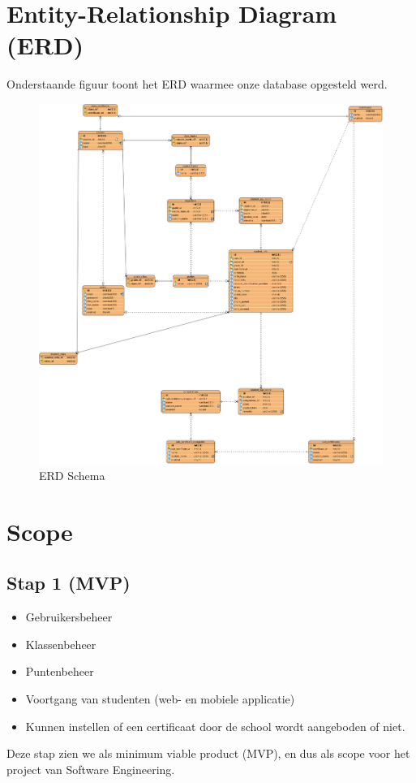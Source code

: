 \documentclass[a4paper]{article}
\begin{document}
\section{Entity-Relationship Diagram (ERD)}
Onderstaande figuur toont het ERD waarmee onze database opgesteld werd.
\begin{figure}[H]
  \centerline{\includegraphics[width=\textwidth*4/5]{modulo}}
  \caption{ERD Schema}
  \label{fig:erd_schema}
\end{figure}




\newpage
\section{Scope}
\label{scope}
\subsection{Stap 1 (MVP)}
\begin{itemize} 
    \item Gebruikersbeheer
    \item Klassenbeheer
    \item Puntenbeheer
    \item Voortgang van studenten (web- en mobiele applicatie)
    \item Kunnen instellen of een certificaat door de school wordt aangeboden of niet.
\end{itemize}
Deze stap zien we als minimum viable product (MVP), en dus als scope voor het project van Software Engineering. 
\end{document}
